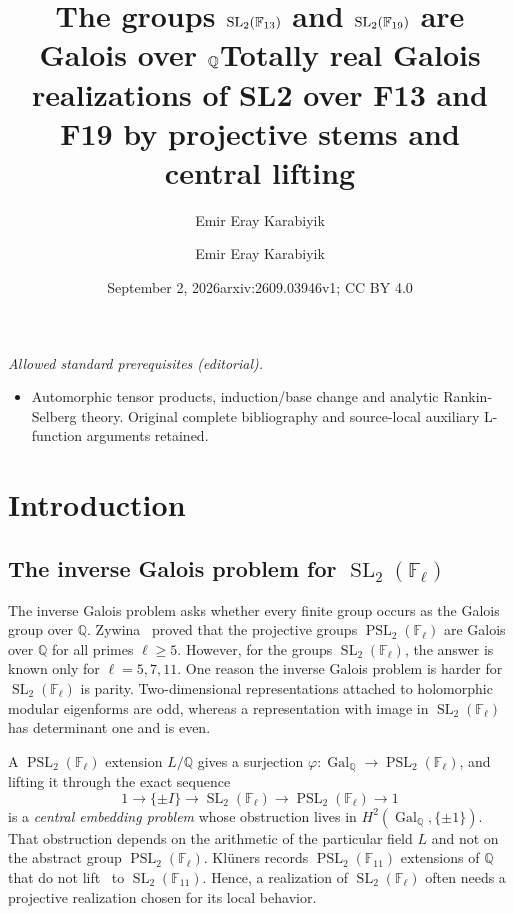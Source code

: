 \documentclass[10pt]{amsart}
\title{The groups
  $\SL_2(\F_{13})$ and $\SL_2(\F_{19})$ are Galois over $\Q$}
\author{Emir Eray Karabiyik}
\date{September 2, 2026}
\title{Totally real Galois realizations of SL2 over F13 and F19 by projective stems and central lifting}
\author{Emir Eray Karabiyik}
\date{arxiv:2609.03946v1; CC BY 4.0}
\numberwithin{equation}{section}
\newcommand{\GQ}{\Gal_{\Q}}
\theoremstyle{definition}
\theoremstyle{remark}
\newcommand{\QQ}{\mathbb Q}
\newcommand{\F}{\mathbb{F}}
\newcommand{\Q}{\mathbb{Q}}
\newcommand{\SL}{\operatorname{SL}}
\newcommand{\PSL}{\operatorname{PSL}}
\newcommand{\Gal}{\operatorname{Gal}}
\begin{document}
\maketitle
\noindent\textit{Allowed standard prerequisites (editorial).}\begin{itemize}
\item Automorphic tensor products, induction/base change and analytic Rankin-Selberg theory. Original complete bibliography and source-local auxiliary L-function arguments retained.
\end{itemize}\medskip
\section{Introduction}\label{sec:introduction}

\subsection{The inverse Galois problem for \texorpdfstring{$\SL_2(\F_\ell)$}
  {SL2(Fl)}}\label{subsec:intro-statement}
The inverse Galois problem asks whether every finite group occurs as the
Galois group over $\Q$. Zywina~\cite{Zywina2015} proved that the projective groups $\PSL_2(\F_\ell)$ are Galois over $\QQ$ for all primes $\ell\geq 5$. However, for the groups $\SL_2(\F_\ell)$, the answer is known only for $\ell=5,7,11$. One reason the inverse Galois problem is harder for
  $\SL_2(\F_\ell)$ is parity.  Two-dimensional representations attached to
  holomorphic modular eigenforms are odd, whereas a representation with
  image in $\SL_2(\F_\ell)$ has determinant one and is even.
 
A $\PSL_2(\F_\ell)$ extension $L/\Q$
gives a surjection $\varphi\colon\GQ\to\PSL_2(\F_\ell)$, and lifting it through the exact sequence
\begin{equation}\label{eq:central-extension}
 1\longrightarrow\{\pm I\}\longrightarrow\SL_2(\F_\ell)
 \longrightarrow\PSL_2(\F_\ell)\longrightarrow1
\end{equation}
is a \emph{central embedding problem} whose obstruction lives in
$H^2(\GQ,\{\pm1\})$. That obstruction depends on the arithmetic of the
particular field $L$ and not on the abstract group $\PSL_2(\F_\ell)$. Kl\"uners records $\PSL_2(\F_{11})$ extensions of $\Q$
that do not lift~\cite{Klueners2000} to $\SL_2(\F_{11})$. Hence, a realization of $\SL_2(\F_\ell)$
often needs a projective realization chosen for its local behavior.
\end{document}
